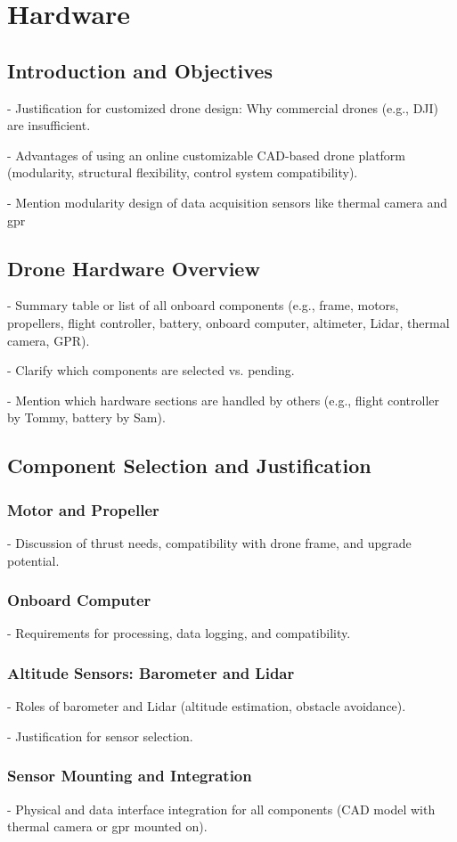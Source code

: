 \newpage
{}
\setlength{\parindent}{0pt}

\section{Hardware} \label{hardware}

\subsection{Introduction and Objectives}
- Justification for customized drone design: Why commercial drones (e.g., DJI) are insufficient.

- Advantages of using an online customizable CAD-based drone platform (modularity, structural flexibility, control system compatibility).

- Mention modularity design of data acquisition sensors like thermal camera and gpr 

\subsection{Drone Hardware Overview}
- Summary table or list of all onboard components (e.g., frame, motors, propellers, flight controller, battery, onboard computer, altimeter, Lidar, thermal camera, GPR).

- Clarify which components are selected vs. pending.

- Mention which hardware sections are handled by others (e.g., flight controller by Tommy, battery by Sam).

\subsection{Component Selection and Justification}
\subsubsection{Motor and Propeller}
- Discussion of thrust needs, compatibility with drone frame, and upgrade potential.
\subsubsection{Onboard Computer}
- Requirements for processing, data logging, and compatibility.
\subsubsection{Altitude Sensors: Barometer and Lidar}
- Roles of barometer and Lidar (altitude estimation, obstacle avoidance).

- Justification for sensor selection.
\subsubsection{Sensor Mounting and Integration}
- Physical and data interface integration for all components (CAD model with thermal camera or gpr mounted on).
